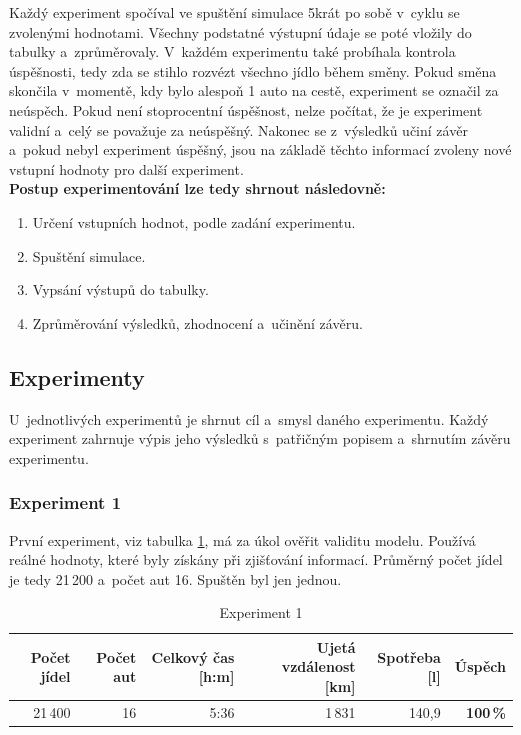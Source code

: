 \documentclass[a4paper, 11pt]{article}
\begin{document}
	Každý experiment spočíval ve spuštění simulace 5krát po sobě v~cyklu se
	zvolenými hodnotami. Všechny podstatné výstupní údaje se poté vložily do
	tabulky a~zprůměrovaly. V~každém experimentu také probíhala kontrola
	úspěšnosti, tedy zda se stihlo rozvézt všechno jídlo během směny. Pokud
	směna skončila v~momentě, kdy bylo alespoň 1 auto na cestě, experiment se
	označil za neúspěch. Pokud není stoprocentní úspěšnost, nelze počítat,
	že je experiment validní a~celý se považuje za neúspěšný. Nakonec se
	z~výsledků učiní závěr a~pokud nebyl experiment úspěšný, jsou na základě
	těchto informací zvoleny nové vstupní hodnoty pro další experiment. \\

	\textbf{Postup experimentování lze tedy shrnout následovně:}
	\begin{enumerate}
		\item Určení vstupních hodnot, podle zadání experimentu.
		\item Spuštění simulace.
		\item Vypsání výstupů do tabulky.
		\item Zprůměrování výsledků, zhodnocení a~učinění závěru.
	\end{enumerate}


	\subsection{Experimenty}
	\label{sectiion:experiments}

	U~jednotlivých experimentů je shrnut cíl a~smysl daného experimentu.
	Každý experiment zahrnuje výpis jeho výsledků s~patřičným popisem
	a~shrnutím závěru experimentu.


	\subsubsection{Experiment 1}
	\label{section:experiment1}

	První experiment, viz tabulka \ref{table:experiment1}, má za úkol ověřit
	validitu modelu. Používá reálné hodnoty, které byly získány při zjišťování
	informací. Průměrný počet jídel je tedy 21\,200 a~počet aut 16. Spuštěn
	byl jen jednou.

	\begin{table}[ht]
		\centering
		\begin{tabular}{|r|r|r|r|r|r|}
			\hline
			Počet jídel & Počet aut & Celkový čas [h:m]
				& Ujetá vzdálenost [km] & Spotřeba [l]
				& \textbf{Úspěch} \\ \hline

			21\,400 & 16 & 5:36 & 1\,831 & 140,9 & \textbf{100\,\%} \\ \hline
		\end{tabular}

		\caption{Experiment 1}
		\label{table:experiment1}
	\end{table}
\end{document}
